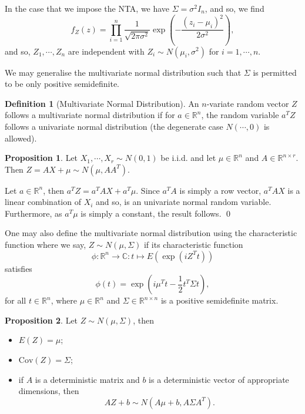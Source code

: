 \documentclass[
]{article}
\theoremstyle{definition}
\newtheorem{prop}{Proposition}
\theoremstyle{definition}
\newtheorem{definition}{Definition}[section]
\begin{document}
In the case that we impose the NTA, we have \(\Sigma = \sigma^2 I_n\),
and so, we find
\[f_Z(z) = \prod_{i = 1}^n \frac{1}{\sqrt{2\pi\sigma^2}} 
  \exp \left(- \frac{(z_i - \mu_i)^2}{2\sigma^2}\right),\] and so,
\(Z_1, \cdots, Z_n\) are independent with
\(Z_i \sim N(\mu_i, \sigma^2)\) for \(i = 1, \cdots, n\).

We may generalise the multivariate normal distribution such that
\(\Sigma\) is permitted to be only positive semidefinite.

\begin{definition}[Multivariate Normal Distribution]
  An \(n\)-variate random vector \(Z\) follows a multivariate normal distribution 
  if for \(a \in \mathbb{R}^n\), the random variable \(a^T Z\) follows a univariate 
  normal distribution (the degenerate case \(N(\cdots, 0)\) is allowed). 
\end{definition}

\begin{prop}
  Let \(X_1, \cdots, X_r \sim N(0, 1)\) be i.i.d. and let \(\mu \in \mathbb{R}^n\) 
  and \(A \in \mathbb{R}^{n \times r}\). Then \(Z = A X + \mu \sim N(\mu, A A^T)\).
\end{prop}
\proof

Let \(a \in \mathbb{R}^n\), then \(a^T Z = a^T A X + a^T \mu\). Since
\(a^T A\) is simply a row vector, \(a^T A X\) is a linear combination of
\(X_i\) and so, is an univariate normal random variable. Furthermore, as
\(a^T \mu\) is simply a constant, the result follows. \qed

One may also define the multivariate normal distribution using the
characteristic function where we say, \(Z \sim N(\mu, \Sigma)\) if its
characteristic function
\[\phi : \mathbb{R}^n \to \mathbb{C} : t \mapsto E(\exp(i Z^T t))\]
satisfies
\[\phi(t) = \exp \left(i \mu^T t - \frac{1}{2}t^T \Sigma t\right),\] for
all \(t \in \mathbb{R}^n\), where \(\mu \in \mathbb{R}^n\) and
\(\Sigma \in \mathbb{R}^{n \times n}\) is a positive semidefinite
matrix.

\begin{prop}
  Let \(Z \sim N(\mu, \Sigma)\), then 
  \begin{itemize}
    \item \(E(Z) = \mu\);
    \item \(\text{Cov}(Z) = \Sigma\);
    \item if \(A\) is a deterministic matrix and \(b\) is a deterministic vector 
      of appropriate dimensions, then 
      \[A Z + b \sim N(A\mu + b, A \Sigma A^T).\]
  \end{itemize}
\end{prop}
\proof
\end{document}
